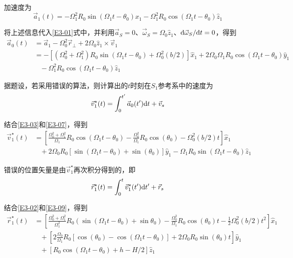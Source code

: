 \documentclass[10pt,a4paper,onecolumn,UTF8]{ctexart}
\begin{document}
	加速度为
	\begin{equation}
		\vec a_1(t)=-\Omega_1^2R_0\sin(\Omega_1t-\theta_0)\hat x_1-\Omega_1^2R_0\cos(\Omega_1t-\theta_0)\hat z_1
	\end{equation}
	
	将上述信息代入\eqref{E3-01}式中，并利用$\vec a_S=0$、$\vec \omega_S=\Omega_0\hat z_1$、$\mathrm{d}\vec\omega_S/\mathrm{d} t=0$，得到
	\begin{equation}\label{E3-07}
		\begin{aligned}
			\vec a_0(t)&=\vec a_1-\Omega_0^2\vec r_{\perp}+2\Omega_0\hat z_1\times \vec v_1\\
			&=-\left[(\Omega_0^2+\Omega_1^2)R_0\sin(\Omega_1t-\theta_0)+\Omega_0^2(b/2)\right]\hat x_1+2\Omega_0\Omega_1R_0\cos(\Omega_1t-\theta_0)\hat y_1\\&\,\,\,\,\,-\Omega_1^2R_0\cos(\Omega_1t-\theta_0)\hat z_1
		\end{aligned}
	\end{equation}
	
	据题设，若采用错误的算法，则计算出的$t$时刻在$S_1$参考系中的速度为
	\begin{equation}
		\vec v_1^{\star}(t)=\int_{0}^{t'}\vec a_0(t')\mathrm{d} t+\vec v_s
	\end{equation}
	
	结合\eqref{E3-03}和\eqref{E3-07}，得到
	\begin{equation}\label{E3-09}
		\begin{aligned}
			\vec v_1^{\star}(t)&=\left[\frac{\Omega_0^2+\Omega_1^2}{\Omega_1}R_0\cos(\Omega_1t-\theta_0)-\frac{\Omega_0^2}{\Omega_1}R_0\cos(\theta_0)-\Omega_0^2(b/2)t\right]\hat x_1\\
			&\,\,\,\,\,+2\Omega_0R_0\left[\sin(\Omega_1t-\theta_0)+\sin(\theta_0)\right]\hat y_1-\Omega_1R_0\sin(\Omega_1t-\theta_0)\hat z_1
		\end{aligned}
	\end{equation}
	
	错误的位置矢量是由$\vec v_1^{\star}$再次积分得到的，即
	\begin{equation}
		\vec r_1^{\star}(t)=\int_{0}^{t}\vec v_1^{\star}(t')\mathrm{d} t'+\vec r_s
	\end{equation}
	
	结合\eqref{E3-02}和\eqref{E3-09}，得到
	\begin{equation}\label{E3-11}
		\begin{aligned}
			\vec r_1^{\star}(t)&=\left[\frac{\Omega_0^2+\Omega_1^2}{\Omega_1^2}R_0\left(\sin(\Omega_1t-\theta_0)+\sin\theta_0\right)-\frac{\Omega_0^2}{\Omega_1}R_0\cos(\theta_0)t-\frac1 2\Omega_0^2(b/2)t^2\right]\hat x_1\\
			&\,\,\,\,\,+\left[2\frac{\Omega_0}{\Omega_1}R_0[\cos(\theta_0)-\cos(\Omega_1t-\theta_0)]+2\Omega_0R_0\sin(\theta_0)t\right]\hat y_1\\
			&\,\,\,\,\,+\left[R_0\cos(\Omega_1t-\theta_0)+h-H/2\right]\hat z_1
		\end{aligned}
	\end{equation}
	
\end{document}
